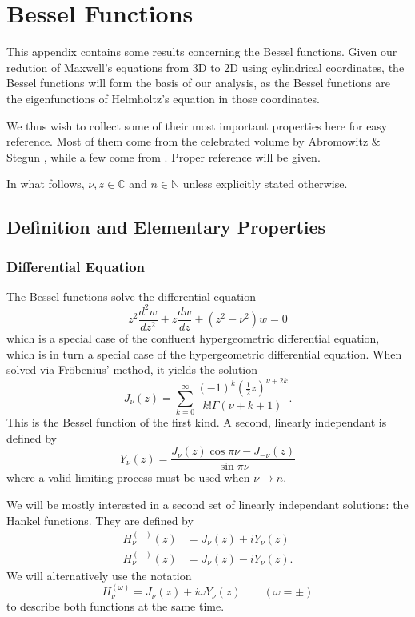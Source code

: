 \chapter{Bessel Functions}
This appendix contains some results concerning the 
Bessel functions. Given our redution of Maxwell's equations 
from 3D to 2D using cylindrical coordinates, the 
Bessel functions will form the basis of our analysis, 
as the Bessel functions are the eigenfunctions of
Helmholtz's equation in those coordinates.

We thus wish to collect some of their most important
properties here for easy reference. Most of them come from the celebrated
volume by Abromowitz \& Stegun \cite{ABR1965}, while a few
come from \cite{CUY2008}. Proper reference will be given. 

In what follows, $\nu,z\in\mathbb{C}$ and $n\in\mathbb{N}$ unless explicitly
stated otherwise.

\section{Definition and Elementary Properties}

\subsection{Differential Equation}
The Bessel functions solve the differential equation
  \begin{equation}
   \label{eq:app.Bessel.diffEquation}
   z^2\frac{d^2w}{dz^2}+z\frac{dw}{dz}+(z^2-\nu^2)w=0
  \end{equation}
which is a special case of the confluent hypergeometric
differential equation, which is in turn a special case
of the hypergeometric differential equation. When solved
via Fröbenius' method, it yields the solution
  \begin{equation}
   \label{eq:app.Bessel.seriesJ}
   J_\nu(z) = \sum_{k=0}^\infty \frac{(-1)^k\left(\frac{1}{2}z\right)^{\nu+2k}}{k!\Gamma(\nu+k+1)}.
  \end{equation}
This is the Bessel function of the first kind. A second, linearly independant
is defined by
  \begin{equation}
   Y_\nu(z) = \frac{J_\nu(z)\cos\pi\nu-J_{-\nu}(z)}{\sin\pi\nu}
  \end{equation}
where a valid limiting process must be used when $\nu\rightarrow n$. 

We will be mostly interested in a second set of linearly independant
solutions: the Hankel functions. They are defined by 
  \begin{subequations}
  \label{eq:app.Bessel.hankelDef}
  \begin{align}
   H_\nu^{(+)}(z)	&= J_\nu(z)+iY_\nu(z)	\\
   H_\nu^{(-)}(z)	&= J_\nu(z)-iY_\nu(z).
  \end{align}
  \end{subequations}
We will alternatively use the notation
  \begin{equation}
   H_\nu^{(\omega)} = J_\nu(z)+i\omega Y_\nu(z)\qquad (\omega=\pm)
  \end{equation}
to describe both functions at the same time.

